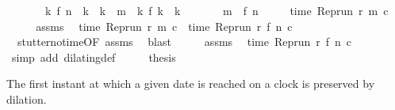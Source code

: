 \begin{isabellebody}
\ \ \ \ \ \ \ {\isacartoucheopen}{\isasymAnd}k{\isachardot}\ f\ n\ {\isacharless}\ k\ {\isasymand}\ k\ {\isasymle}\ m\ {\isasymLongrightarrow}\ {\isacharparenleft}{\isasymnexists}k\ f\ k\ {\isacharequal}\ k{\isacharparenright}{\isacartoucheclose}\isanewline
\ \ \ \ \ \ \ {\isacartoucheopen}m\ {\isachargreater}\ f\ n{\isacartoucheclose}\isanewline
\ \ \ \ \ {\isacartoucheopen}time\ {\isacharparenleft}{\isacharparenleft}Rep{\isacharunderscore}run\ r{\isacharparenright}\ m\ c{\isacharparenright}\ {\isacharequal}\ {\isasymtau}{\isacartoucheclose}\isanewline
%
\isadelimproof
%
\endisadelimproof
%
\isatagproof
{}\isamarkupfalse%
\ {\isacharminus}\isanewline
\ \ \isamarkupfalse%
\ assms{\isacharparenleft}{}{\isacharparenright}\ \isamarkupfalse%
\ {\isacartoucheopen}time\ {\isacharparenleft}{\isacharparenleft}Rep{\isacharunderscore}run\ r{\isacharparenright}\ m\ c{\isacharparenright}\ {\isacharequal}\ time\ {\isacharparenleft}{\isacharparenleft}Rep{\isacharunderscore}run\ r{\isacharparenright}\ {\isacharparenleft}f\ n{\isacharparenright}\ c{\isacharparenright}{\isacartoucheclose}\isanewline
\ \ \ \ \isamarkupfalse%
\ \ stutter{\isacharunderscore}no{\isacharunderscore}time{\isacharbrackleft}OF\ assms{\isacharparenleft}{}{\isacharcomma}{}{\isacharcomma}{}{\isacharparenright}{\isacharbrackright}\ \isamarkupfalse%
\ blast\isanewline
\ \ \isamarkupfalse%
\ \isamarkupfalse%
\ assms{\isacharparenleft}{}{\isacharcomma}{}{\isacharparenright}\ \isamarkupfalse%
\ {\isacartoucheopen}time\ {\isacharparenleft}{\isacharparenleft}Rep{\isacharunderscore}run\ r{\isacharparenright}\ {\isacharparenleft}f\ n{\isacharparenright}\ c{\isacharparenright}\ {\isacharequal}\ {\isasymtau}{\isacartoucheclose}\ \isamarkupfalse%
\ {\isacharparenleft}simp\ add{\isacharcolon}\ dilating{\isacharunderscore}def{\isacharparenright}\isanewline
\ \ \isamarkupfalse%
\ \isamarkupfalse%
\ {\isacharquery}thesis\ \isacommand{{\isachardot}}\isamarkupfalse%
\isanewline
{}\isamarkupfalse%
%
\endisatagproof
{\isafoldproof}%
%
\isadelimproof
%
\endisadelimproof
%
\begin{isamarkuptext}%
The first instant at which a given date is reached on a clock is preserved
  by dilation.%
\end{isamarkuptext}\isamarkuptrue%

\end{isabellebody}
